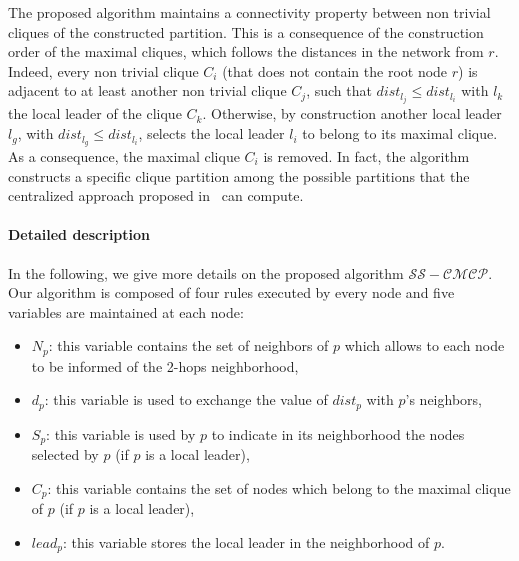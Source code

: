 \documentclass[11pt,letterpaper,onecolumn]{article}
\begin{document}
The proposed algorithm maintains a connectivity property between non trivial cliques of the constructed partition. This is a consequence of the construction order of the maximal cliques, which follows the distances in the network from $r$. Indeed, every non trivial clique $C_i$ (that does not contain the root node $r$) is adjacent to at least another non trivial clique $C_j$, such that $dist_{l_j} \leq dist_{l_i}$ with $l_k$ the local leader of the clique $C_k$. Otherwise, by construction another local leader $l_g$, with $dist_{l_g} \leq dist_{l_i}$, selects the local leader $l_i$ to belong to its maximal clique. As a consequence, the maximal clique $C_i$ is removed. In fact, the algorithm constructs a specific clique partition among the possible partitions that the centralized approach proposed in~\cite{DelbotLP13} can compute.


\paragraph{Detailed description}

In the following, we give more details on the proposed algorithm $\mathcal{SS-CMCP}$. Our algorithm is composed of four rules executed by every node and five variables are maintained at each node:

\begin{itemize}
\item $N_p$: this variable contains the set of neighbors of $p$ which allows to each node to be informed of the 2-hops neighborhood,
\item $d_p$: this variable is used to exchange the value of $dist_p$ with $p$'s neighbors,
\item $S_p$: this variable is used by $p$ to indicate in its neighborhood the nodes selected by $p$ (if $p$ is a local leader),
\item $C_p$: this variable contains the set of nodes which belong to the maximal clique of $p$ (if $p$ is a local leader),
\item $lead_p$: this variable stores the local leader in the neighborhood of $p$.
\end{itemize}
\end{document}
